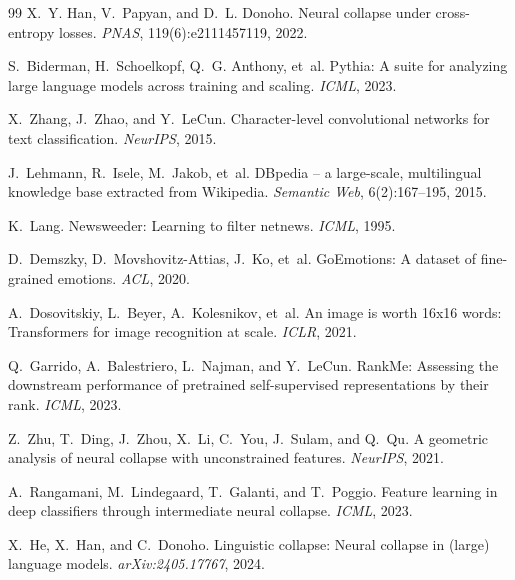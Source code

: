 \documentclass{article}
\begin{document}
\begin{thebibliography}{99}
X.~Y. Han, V.~Papyan, and D.~L. Donoho.
\newblock Neural collapse under cross-entropy losses.
\newblock \emph{PNAS}, 119(6):e2111457119, 2022.

S.~Biderman, H.~Schoelkopf, Q.~G. Anthony, et~al.
\newblock Pythia: A suite for analyzing large language models across training and scaling.
\newblock \emph{ICML}, 2023.

X.~Zhang, J.~Zhao, and Y.~LeCun.
\newblock Character-level convolutional networks for text classification.
\newblock \emph{NeurIPS}, 2015.

J.~Lehmann, R.~Isele, M.~Jakob, et~al.
\newblock DBpedia -- a large-scale, multilingual knowledge base extracted from Wikipedia.
\newblock \emph{Semantic Web}, 6(2):167--195, 2015.

K.~Lang.
\newblock Newsweeder: Learning to filter netnews.
\newblock \emph{ICML}, 1995.

D.~Demszky, D.~Movshovitz-Attias, J.~Ko, et~al.
\newblock GoEmotions: A dataset of fine-grained emotions.
\newblock \emph{ACL}, 2020.

A.~Dosovitskiy, L.~Beyer, A.~Kolesnikov, et~al.
\newblock An image is worth 16x16 words: Transformers for image recognition at scale.
\newblock \emph{ICLR}, 2021.

Q.~Garrido, A.~Balestriero, L.~Najman, and Y.~LeCun.
\newblock RankMe: Assessing the downstream performance of pretrained self-supervised representations by their rank.
\newblock \emph{ICML}, 2023.

Z.~Zhu, T.~Ding, J.~Zhou, X.~Li, C.~You, J.~Sulam, and Q.~Qu.
\newblock A geometric analysis of neural collapse with unconstrained features.
\newblock \emph{NeurIPS}, 2021.

A.~Rangamani, M.~Lindegaard, T.~Galanti, and T.~Poggio.
\newblock Feature learning in deep classifiers through intermediate neural collapse.
\newblock \emph{ICML}, 2023.

X.~He, X.~Han, and C.~Donoho.
\newblock Linguistic collapse: Neural collapse in (large) language models.
\newblock \emph{arXiv:2405.17767}, 2024.


\end{thebibliography}
\end{document}
